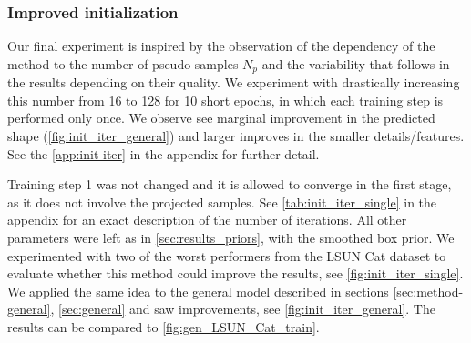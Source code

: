 \subsubsection{Improved initialization}
\label{sec:init_iter}
Our final experiment is inspired by the observation of the dependency of the method to the number of pseudo-samples $N_p$ and the variability that follows in the results depending on their quality. We experiment with drastically increasing this number from 16 to 128 for 10 short epochs, in which each training step is performed only once. We observe see marginal improvement in the predicted shape (\autoref{fig:init_iter_general}) and larger improves in the smaller details/features. See the \autoref{app:init-iter} in the appendix for further detail.

Training step 1 was not changed and it is allowed to converge in the first stage, as it does not involve the projected samples. See \autoref{tab:init_iter_single} in the appendix for an exact description of the number of iterations. All other parameters were left as in \autoref{sec:results_priors}, with the smoothed box prior. We experimented with two of the worst performers from the LSUN Cat dataset to evaluate whether this method could improve the results, see \autoref{fig:init_iter_single}. We applied the same idea to the general model described in sections \ref{sec:method-general}, \ref{sec:general} and saw improvements, see \autoref{fig:init_iter_general}. The results can be compared to \autoref{fig:gen_LSUN_Cat_train}.
